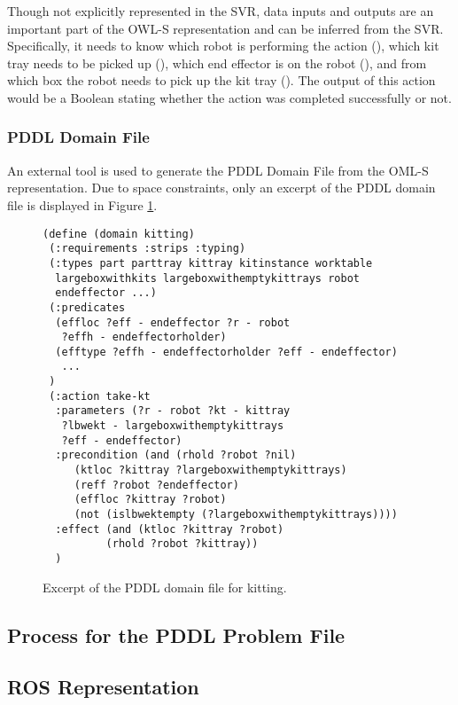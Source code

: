 Though not explicitly represented in the SVR, data inputs and outputs are an important part of the OWL-S representation and can be inferred from the SVR. Specifically, it needs to know which robot is performing the action (), which kit tray needs to be picked up (), which end effector is on the robot (), and from which box the robot needs to pick up the kit tray (). The output of this action would be a Boolean stating whether the action was completed successfully or not.

\subsubsection{PDDL Domain File}
An external tool is used to generate the PDDL Domain File from the OML-S representation. Due to space constraints, only an excerpt of the PDDL domain file is displayed in Figure \ref{fig:domainfile}.

\begin{figure}[h!]
\begin{center}
\begin{minipage}{.5\paperwidth}
\begin{mylisting}
\begin{Verbatim}[commandchars=\\\{\},commandchars=+\[\],fontsize=\scriptsize,numbersep=3pt]
(define (domain kitting)
 (:requirements :strips :typing)
 (:types part parttray kittray kitinstance worktable 
  largeboxwithkits largeboxwithemptykittrays robot 
  endeffector ...)
 (:predicates
  (effloc ?eff - endeffector ?r - robot 
   ?effh - endeffectorholder)
  (efftype ?effh - endeffectorholder ?eff - endeffector)
   ...
 )
 (:action take-kt
  :parameters (?r - robot ?kt - kittray
   ?lbwekt - largeboxwithemptykittrays
   ?eff - endeffector)
  :precondition (and (rhold ?robot ?nil)
     (ktloc ?kittray ?largeboxwithemptykittrays)
     (reff ?robot ?endeffector)
     (effloc ?kittray ?robot)
     (not (islbwektempty (?largeboxwithemptykittrays))))
  :effect (and (ktloc ?kittray ?robot)
          (rhold ?robot ?kittray))
  )
\end{Verbatim}
\end{mylisting}
\end{minipage}
\caption{Excerpt of the PDDL domain file for kitting.\label{fig:domainfile}}
\end{center}
\end{figure}

\subsection{Process for the PDDL Problem File}
\label{subsect:PDDL_Problem_File}


\subsection{ROS Representation} 